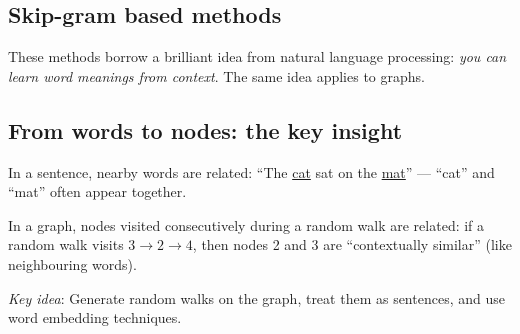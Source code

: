 \begin{notechapter}
\section{Skip-gram based methods}

These methods borrow a brilliant idea from natural language processing: \emph{you can learn word meanings from context}. The same idea applies to graphs.

\subsection{From words to nodes: the key insight}

\begin{intuition}
In a sentence, nearby words are related: ``The \underline{cat} sat on the \underline{mat}'' --- ``cat'' and ``mat'' often appear together.

In a graph, nodes visited consecutively during a random walk are related: if a random walk visits $3 \to 2 \to 4$, then nodes 2 and 3 are ``contextually similar'' (like neighbouring words).

\emph{Key idea}: Generate random walks on the graph, treat them as sentences, and use word embedding techniques.
\end{intuition}

\begin{figure}[htbp]
\centering
{}
\end{figure}
\end{notechapter}
